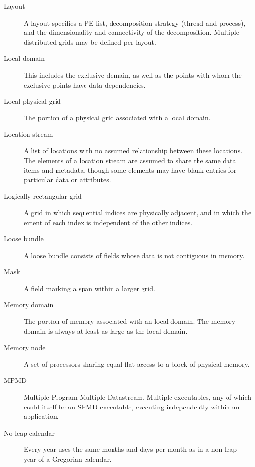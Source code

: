 \begin{description}
\item[Layout] \label{glos:Layout} A layout specifies a PE list, 
  decomposition strategy (thread and process), and the dimensionality 
  and connectivity of the decomposition.  Multiple distributed 
  grids may be defined per layout.

\item[Local domain] \label{glos:LocalDomain} This includes the exclusive 
  domain, as well as the points with whom the exclusive points have data 
  dependencies.

\item[Local physical grid] \label{glos:LocPhysGrid} The portion of a 
  physical grid associated with a local domain.  

\item[Location stream] \label{glos:LocStream} A list of
  locations with no assumed relationship between these locations.  The
  elements of a location stream are assumed to share the same data
  items and metadata, though some elements may have blank entries for
  particular data or attributes.

\item[Logically rectangular grid] \label{glos:RecGrid} A grid in 
  which sequential indices are physically adjacent, and in which the 
  extent of each index is independent of the other indices.

\item[Loose bundle] \label{glos:LooseBundle} A loose bundle consists of 
  fields whose data is not contiguous in memory.

\item[Mask] \label{glos:Mask} A field marking a span within a larger grid.

\item[Memory domain] \label{glos:MemDomain} The portion of memory 
  associated with an local domain.  The memory domain is always at least 
  as large as the local domain.

\item[Memory node] \label{glos:Mnode} A set of processors
  sharing equal flat access to a block of physical memory.

\item[MPMD] \label{glos:MPMD} Multiple Program Multiple Datastream.
  Multiple executables, any of which could itself be an SPMD
  executable, executing independently within an application.

\item [No-leap calendar] \label{glos:NoLeap} Every year uses the same months 
and days per month as in a non-leap year of a Gregorian calendar.


\end{description}
